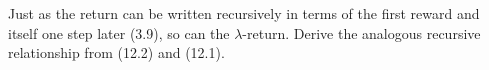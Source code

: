 
\begin{exercise}[Exercise 12.1]

Just as the return can be written recursively in terms of the first reward
and itself one step later (3.9), so can the $\lambda$-return.
Derive the analogous recursive relationship from (12.2) and (12.1).

\end{exercise}


\begin{solution}

\phantom{}

\end{solution}

